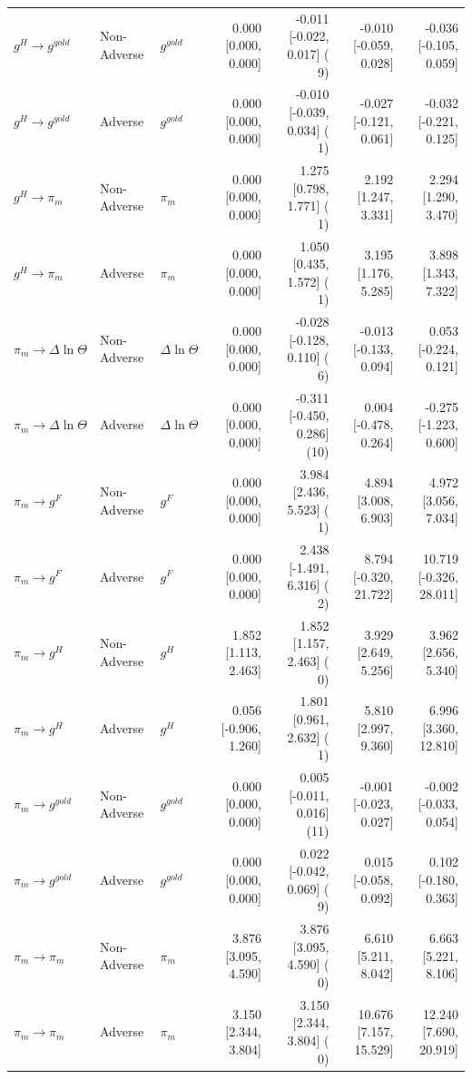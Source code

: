 \begin{table}[htbp]
{\begin{tabular}{lllrrrr}
$g^H \to g^{gold}$ & Non-Adverse & $g^{gold}$ & 0.000 [0.000, 0.000] & -0.011 [-0.022, 0.017] ( 9) & -0.010 [-0.059, 0.028] & -0.036 [-0.105, 0.059] \\
$g^H \to g^{gold}$ & Adverse & $g^{gold}$ & 0.000 [0.000, 0.000] & -0.010 [-0.039, 0.034] ( 1) & -0.027 [-0.121, 0.061] & -0.032 [-0.221, 0.125] \\
$g^H \to \pi_m$ & Non-Adverse & $\pi_m$ & 0.000 [0.000, 0.000] & 1.275 [0.798, 1.771] ( 1) & 2.192 [1.247, 3.331] & 2.294 [1.290, 3.470] \\
$g^H \to \pi_m$ & Adverse & $\pi_m$ & 0.000 [0.000, 0.000] & 1.050 [0.435, 1.572] ( 1) & 3.195 [1.176, 5.285] & 3.898 [1.343, 7.322] \\
$\pi_m \to \Delta\ln\Theta$ & Non-Adverse & $\Delta\ln\Theta$ & 0.000 [0.000, 0.000] & -0.028 [-0.128, 0.110] ( 6) & -0.013 [-0.133, 0.094] & 0.053 [-0.224, 0.121] \\
$\pi_m \to \Delta\ln\Theta$ & Adverse & $\Delta\ln\Theta$ & 0.000 [0.000, 0.000] & -0.311 [-0.450, 0.286] (10) & 0.004 [-0.478, 0.264] & -0.275 [-1.223, 0.600] \\
$\pi_m \to g^F$ & Non-Adverse & $g^F$ & 0.000 [0.000, 0.000] & 3.984 [2.436, 5.523] ( 1) & 4.894 [3.008, 6.903] & 4.972 [3.056, 7.034] \\
$\pi_m \to g^F$ & Adverse & $g^F$ & 0.000 [0.000, 0.000] & 2.438 [-1.491, 6.316] ( 2) & 8.794 [-0.320, 21.722] & 10.719 [-0.326, 28.011] \\
$\pi_m \to g^H$ & Non-Adverse & $g^H$ & 1.852 [1.113, 2.463] & 1.852 [1.157, 2.463] ( 0) & 3.929 [2.649, 5.256] & 3.962 [2.656, 5.340] \\
$\pi_m \to g^H$ & Adverse & $g^H$ & 0.056 [-0.906, 1.260] & 1.801 [0.961, 2.632] ( 1) & 5.810 [2.997, 9.360] & 6.996 [3.360, 12.810] \\
$\pi_m \to g^{gold}$ & Non-Adverse & $g^{gold}$ & 0.000 [0.000, 0.000] & 0.005 [-0.011, 0.016] (11) & -0.001 [-0.023, 0.027] & -0.002 [-0.033, 0.054] \\
$\pi_m \to g^{gold}$ & Adverse & $g^{gold}$ & 0.000 [0.000, 0.000] & 0.022 [-0.042, 0.069] ( 9) & 0.015 [-0.058, 0.092] & 0.102 [-0.180, 0.363] \\
$\pi_m \to \pi_m$ & Non-Adverse & $\pi_m$ & 3.876 [3.095, 4.590] & 3.876 [3.095, 4.590] ( 0) & 6.610 [5.211, 8.042] & 6.663 [5.221, 8.106] \\
$\pi_m \to \pi_m$ & Adverse & $\pi_m$ & 3.150 [2.344, 3.804] & 3.150 [2.344, 3.804] ( 0) & 10.676 [7.157, 15.529] & 12.240 [7.690, 20.919] \\

\end{tabular}}
\end{table}
